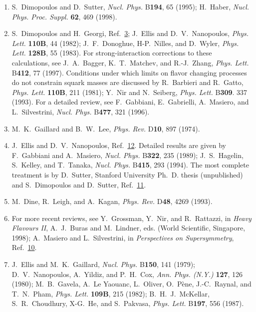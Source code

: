\begin{enumerate}
  \item {}\label{ch28-ref-11}
  S.~Dimopoulos and D.~Sutter, \textit{Nucl. Phys.} B\textbf{194}, 65
  (1995); H.~Haber, \textit{Nucl. Phys. Proc. Suppl.} \textbf{62}, 469
  (1998).

  \item {}\label{ch28-ref-12}
  S.~Dimopoulos and H.~Georgi, Ref.~\hyperref[ch28-ref-3]{3};
  J.~Ellis and D.~V.~Nanopoulos, \textit{Phys. Lett.} \textbf{110B},
  44 (1982); J.~F.~Donoghue, H-P.~Nilles, and D.~Wyler,
  \textit{Phys. Lett.} \textbf{128B}, 55 (1983). For
  strong-interaction corrections to these calculations, see
  J.~A.~Bagger, K.~T.~Matchev, and R.-J.~Zhang,
  \textit{Phys. Lett.} B\textbf{412}, 77 (1997). Conditions under
  which limits on flavor changing processes do not constrain squark
  masses are discussed by R.~Barbieri and R.~Gatto,
  \textit{Phys. Lett.} \textbf{110B}, 211 (1981); Y.~Nir and
  N.~Seiberg, \textit{Phys. Lett.} B\textbf{309}. 337 (1993). For a
  detailed review, see F.~Gabbiani, E.~Gabrielli, A.~Masiero, and
  L.~Silvestrini, \textit{Nucl. Phys.} B\textbf{477}, 321 (1996).

  \item {}\label{ch28-ref-13}
  M.~K.~Gaillard and B.~W.~Lee, \textit{Phys. Rev.} D\textbf{10}, 897
  (1974).

  \item {}\label{ch28-ref-14}
  J.~Ellis and D.~V.~Nanopoulos, Ref.~\hyperref[ch28-ref-12]{12}.
  Detailed results are given by F.~Gabbiani and A.~Masiero,
  \textit{Nucl. Phys.} B\textbf{322}, 235 (1989); J.~S.~Hagelin,
  S.~Kelley, and T.~Tanaka, \textit{Nucl. Phys.} B\textbf{415}, 293
  (1994). The most complete treatment is by D.~Sutter, Stanford
  University Ph.~D. thesis (unpublished) and S.~Dimopoulos and
  D.~Sutter, Ref.~\hyperref[ch28-ref-11]{11}.

  \item[14a.] \label{ch28-ref-14a}
  M.~Dine, R.~Leigh, and A.~Kagan, \textit{Phys. Rev.} D\textbf{48},
  4269 (1993).

  \item {}\label{ch28-ref-15}
  For more recent reviews, see Y.~Grossman, Y.~Nir, and R.~Rattazzi,
  in \textit{Heavy Flavours II}, A.~J.~Buras and M.~Lindner, eds.
  (World Scientific, Singapore, 1998); A.~Masiero and L.~Silvestrini,
  in \textit{Perspectives on Supersymmetry},
  Ref.~\hyperref[ch28-ref-10]{10}.

  \item {}\label{ch28-ref-16}
  J.~Ellis and M.~K.~Gaillard, \textit{Nucl. Phys.} B\textbf{150}, 141
  (1979); D.~V.~Nanopoulos, A.~Yildiz, and P.~H.~Cox,
  \textit{Ann. Phys. (N.Y.)} \textbf{127}, 126 (1980); M.~B.~Gavela,
  A.~Le Yaouanc, L.~Oliver, O.~P\`ene, J.-C.~Raynal, and T.~N.~Pham,
  \textit{Phys. Lett.} \textbf{109B}, 215 (1982); B.~H.~J.~McKellar,
  S.~R.~Choudhury, X-G.~He, and S.~Pakvasa, \textit{Phys. Lett.}
  B\textbf{197}, 556 (1987).


\end{enumerate}
